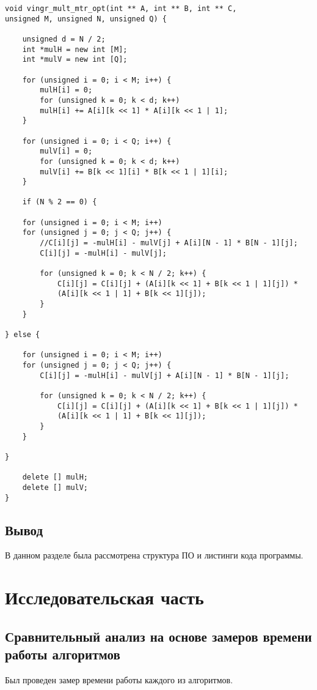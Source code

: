 \documentclass[12pt]{report}
\begin{document}
\begin{lstlisting}[label=some-code,caption=Оптимизированный алгоритм Винограда]
void vingr_mult_mtr_opt(int ** A, int ** B, int ** C,
unsigned M, unsigned N, unsigned Q) {
	
	unsigned d = N / 2;
	int *mulH = new int [M];
	int *mulV = new int [Q];
	
	for (unsigned i = 0; i < M; i++) {
		mulH[i] = 0;
		for (unsigned k = 0; k < d; k++)
		mulH[i] += A[i][k << 1] * A[i][k << 1 | 1];
	}
	
	for (unsigned i = 0; i < Q; i++) {
		mulV[i] = 0;
		for (unsigned k = 0; k < d; k++)
		mulV[i] += B[k << 1][i] * B[k << 1 | 1][i];
	}
	
	if (N % 2 == 0) {
	
	for (unsigned i = 0; i < M; i++)
	for (unsigned j = 0; j < Q; j++) {
		//C[i][j] = -mulH[i] - mulV[j] + A[i][N - 1] * B[N - 1][j];
		C[i][j] = -mulH[i] - mulV[j];
		
		for (unsigned k = 0; k < N / 2; k++) {
			C[i][j] = C[i][j] + (A[i][k << 1] + B[k << 1 | 1][j]) *
			(A[i][k << 1 | 1] + B[k << 1][j]);
		}
	}
	
} else {
	
	for (unsigned i = 0; i < M; i++)
	for (unsigned j = 0; j < Q; j++) {
		C[i][j] = -mulH[i] - mulV[j] + A[i][N - 1] * B[N - 1][j];
		
		for (unsigned k = 0; k < N / 2; k++) {
			C[i][j] = C[i][j] + (A[i][k << 1] + B[k << 1 | 1][j]) *
			(A[i][k << 1 | 1] + B[k << 1][j]);
		}
	}
	
}

	delete [] mulH;
	delete [] mulV;
}
\end{lstlisting}

\section{Вывод}
В данном разделе была рассмотрена структура ПО и листинги кода программы.


\chapter{Исследовательская часть}

\section{Сравнительный анализ на основе замеров времени работы алгоритмов}

Был проведен замер времени работы каждого из алгоритмов.
\end{document}
